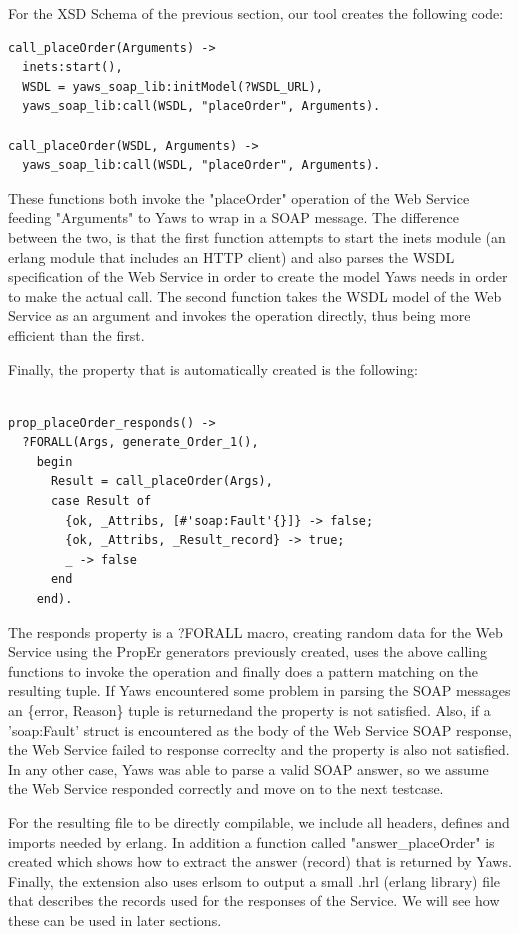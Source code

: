 \documentclass[submission,copyright,a4]{eptcs}
\begin{document}
For the XSD Schema of the previous section, our tool creates the following code:

\begin{lstlisting}
call_placeOrder(Arguments) ->
  inets:start(),
  WSDL = yaws_soap_lib:initModel(?WSDL_URL),
  yaws_soap_lib:call(WSDL, "placeOrder", Arguments).
    
call_placeOrder(WSDL, Arguments) ->
  yaws_soap_lib:call(WSDL, "placeOrder", Arguments).
\end{lstlisting}

These functions both invoke the "placeOrder" operation of the Web Service feeding "Arguments" to Yaws to wrap in a SOAP message. The difference between the two, is that the first function attempts to start the inets module (an erlang module that includes an HTTP client) and also parses the WSDL specification of the Web Service in order to create the model Yaws needs in order to make the actual call. The second function takes the WSDL model of the Web Service as an argument and invokes the operation directly, thus being more efficient than the first.

Finally, the property that is automatically created is the following:

\begin{lstlisting}

prop_placeOrder_responds() ->
  ?FORALL(Args, generate_Order_1(),
    begin
      Result = call_placeOrder(Args),
      case Result of 
        {ok, _Attribs, [#'soap:Fault'{}]} -> false;
        {ok, _Attribs, _Result_record} -> true;
        _ -> false
      end
    end).
\end{lstlisting}

The responds property is a ?FORALL macro, creating random data for the Web Service using the PropEr generators previously created, uses the above calling functions to invoke the operation and finally does a pattern matching on the resulting tuple. If Yaws encountered some problem in parsing the SOAP messages an \{error, Reason\} tuple is returnedand the property is not satisfied. Also, if a 'soap:Fault' struct is encountered as the body of the Web Service SOAP response, the Web Service failed to response correclty and the property is also not satisfied. In any other case, Yaws was able to parse a valid SOAP answer, so we assume the Web Service responded correctly and move on to the next testcase.

For the resulting file to be directly compilable, we include all headers, defines and imports needed by erlang. In addition a function called "answer\_placeOrder" is created which shows how to extract the answer (record) that is returned by Yaws. Finally, the extension also uses erlsom to output a small .hrl (erlang library) file that describes the records used for the responses of the Service. We will see how these can be used in later sections.
\end{document}
